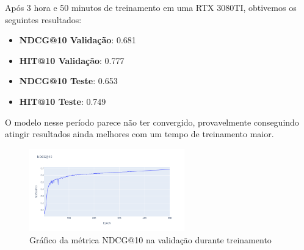 %

Após 3 hora e 50 minutos de treinamento em uma RTX 3080TI, obtivemos
os seguintes resultados:

\begin{itemize}
  \item \textbf{NDCG@10 Validação}: 0.681
  \item \textbf{HIT@10 Validação}: 0.777
  \item \textbf{NDCG@10 Teste}: 0.653
  \item \textbf{HIT@10 Teste}: 0.749
\end{itemize}

O modelo nesse período parece não ter convergido, provavelmente
conseguindo atingir resultados ainda melhores com um tempo de
treinamento maior.

\begin{figure}[H]
    \centering
    \includegraphics[width=0.6\textwidth]{../assets/validation-ndcg.png}
    \caption{Gráfico da métrica NDCG@10 na validação durante treinamento}
\end{figure}

